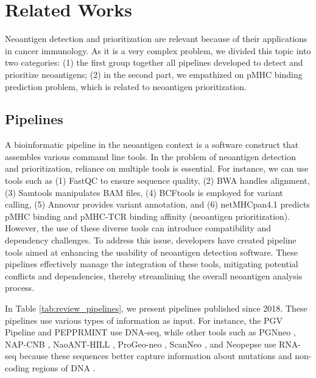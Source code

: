 \section{Related Works}

Neoantigen detection and prioritization are relevant because of their applications in cancer immunology. As it is a very complex problem, we divided this topic into two categories: (1) the first group together all pipelines developed to detect and prioritize neoantigens; (2) in the second part, we empathized on pMHC binding prediction problem, which is related to neoantigen prioritization.  

\subsection{Pipelines}

A bioinformatic pipeline in the neoantigen context is a software construct that assembles various command line tools. In the problem of neoantigen detection and prioritization, reliance on multiple tools is essential. For instance, we can use tools such as (1) FastQC to ensure sequence quality, (2) BWA handles alignment, (3) Samtools manipulates BAM files, (4) BCFtools is employed for variant calling, (5) Annovar provides variant annotation, and (6) netMHCpan4.1 predicts pMHC binding and pMHC-TCR binding affinity (neoantigen prioritization). However, the use of these diverse tools can introduce compatibility and dependency challenges. To address this issue, developers have created pipeline tools aimed at enhancing the usability of neoantigen detection software. These pipelines effectively manage the integration of these tools, mitigating potential conflicts and dependencies, thereby streamlining the overall neoantigen analysis process.


In Table \ref{tab:review_pipelines}, we present pipelines published since 2018. These pipelines use various types of information as input. For instance, the PGV Pipeline \cite{rubinsteyn2018computational} and PEPPRMINT \cite{zhou2023prioritizing} use DNA-seq, while other tools such as PGNneo \cite{tan2023pgnneo}, NAP-CNB \cite{wert2021predicting}, NaoANT-HILL \cite{coelho2020neoant}, ProGeo-neo \cite{li2020progeo}, ScanNeo \cite{wang2019scanneo}, and Neopepse \cite{kim2018neopepsee} use RNA-seq because these sequences better capture information about mutations and non-coding regions of DNA \cite{tan2023pgnneo}.


